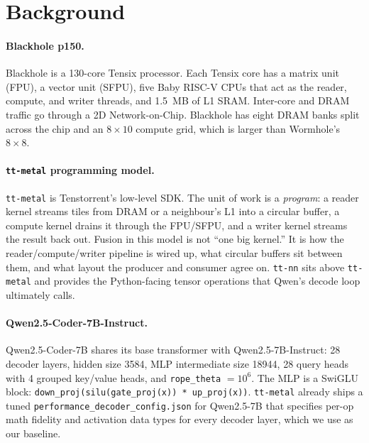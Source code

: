 \documentclass[sigplan,nonacm]{acmart}
\begin{document}
\section{Background}

\paragraph{Blackhole p150.} Blackhole is a 130-core Tensix processor. Each
Tensix core has a matrix unit (FPU), a vector unit (SFPU), five Baby
RISC-V CPUs that act as the reader, compute, and writer threads, and
1.5~MB of L1 SRAM. Inter-core and DRAM traffic go through a 2D
Network-on-Chip. Blackhole has eight DRAM banks split across the chip
and an $8{\times}10$ compute grid, which is larger than Wormhole's
$8{\times}8$.

\paragraph{\texttt{tt-metal} programming model.} \texttt{tt-metal} is
Tenstorrent's low-level SDK. The unit of work is a \emph{program}: a
reader kernel streams tiles from DRAM or a neighbour's L1 into a
circular buffer, a compute kernel drains it through the FPU/SFPU, and
a writer kernel streams the result back out. Fusion in this model is
not ``one big kernel.'' It is how the reader/compute/writer pipeline
is wired up, what circular buffers sit between them, and what
layout the producer and consumer agree on. \texttt{tt-nn} sits above
\texttt{tt-metal} and provides the Python-facing tensor operations
that Qwen's decode loop ultimately calls.

\paragraph{Qwen2.5-Coder-7B-Instruct.} Qwen2.5-Coder-7B shares its
base transformer with Qwen2.5-7B-Instruct: 28 decoder layers, hidden
size 3584, MLP intermediate size 18944, 28 query heads with 4 grouped
key/value heads, and \texttt{rope\_theta} $=10^{6}$. The MLP is a
SwiGLU block: \texttt{down\_proj(silu(gate\_proj(x)) * up\_proj(x))}.
\texttt{tt-metal} already ships a tuned
\texttt{performance\_decoder\_config.json} for Qwen2.5-7B that
specifies per-op math fidelity and activation data types for every
decoder layer, which we use as our baseline.
\end{document}
